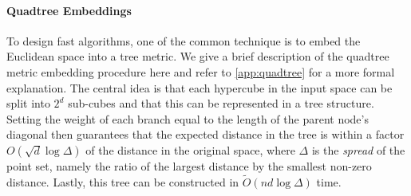 \paragraph*{Quadtree Embeddings}

To design fast algorithms, one of the common technique is to embed the Euclidean space into a tree metric.
We give a brief description of the quadtree metric embedding procedure here and refer to \cref{app:quadtree} for a more formal explanation.  The central idea is
that each hypercube in the input space can be split into $2^d$ sub-cubes and that this can be represented in a tree structure. Setting the weight of each branch
equal to the length of the parent node's diagonal then guarantees that the expected distance in the tree is within a factor $O(\sqrt{d} \log
\Delta)$ of the distance in the original space,
where $\Delta$ is the \emph{spread} of the point set, namely the ratio of the largest distance by the smallest non-zero distance. Lastly, this tree can be constructed in $\tilde{O}(nd \log \Delta)$ time.
